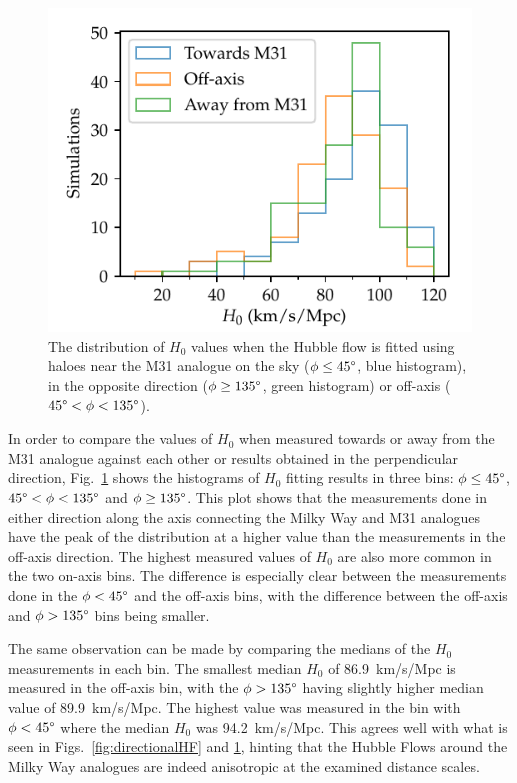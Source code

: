 \documentclass[english, oneside]{HYgradu}
\begin{document}
\begin{figure}
    \centering
    \includegraphics{kuvat/threeDirectionH0.pdf}
    \caption{The distribution of $H_0$ values when the Hubble flow is fitted using haloes near the M31 analogue on the sky ($\phi \leq 45 \degree$, blue histogram), in the opposite direction ($\phi \geq 135 \degree$, green histogram) or off-axis ($45 \degree < \phi < 135 \degree$).}\label{fig:threeDirectionH0}
\end{figure}

In order to compare the values of $H_0$ when measured towards or away from the M31 analogue against each other or results obtained in the perpendicular direction, Fig.~\ref{fig:threeDirectionH0} shows the histograms of $H_0$ fitting results in three bins: $\phi \leq 45 \degree$, $45 \degree < \phi < 135 \degree$ and $\phi \geq 135 \degree$. This plot shows that the measurements done in either direction along the axis connecting the Milky Way and M31 analogues have the peak of the distribution at a higher value than the measurements in the off-axis direction. The highest measured values of $H_0$ are also more common in the two on-axis bins. The difference is especially clear between the measurements done in the $\phi < 45\degree$ and the off-axis bins, with the difference between the off-axis and $\phi > 135\degree$ bins being smaller.

The same observation can be made by comparing the medians of the $H_0$ measurements in each bin. The smallest median $H_0$ of 86.9~km/s/Mpc is measured in the off-axis bin, with the $\phi > 135\degree$ having slightly higher median value of 89.9~km/s/Mpc. The highest value was measured in the bin with $\phi < 45\degree$ where the median $H_0$ was 94.2~km/s/Mpc. This agrees well with what is seen in Figs.~\ref{fig:directionalHF} and \ref{fig:threeDirectionH0}, hinting that the Hubble Flows around the Milky Way analogues are indeed anisotropic at the examined distance scales.
\end{document}
